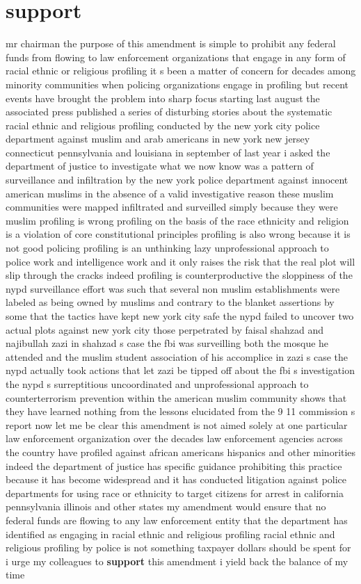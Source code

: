 \documentclass{article}
\begin{document}
\section*{support}
mr chairman the purpose of this amendment is simple to prohibit any federal funds from flowing to law enforcement organizations that engage in any form of racial ethnic or religious profiling it s been a matter of concern for decades among minority communities when policing organizations engage in profiling but recent events have brought the problem into sharp focus starting last august the associated press published a series of disturbing stories about the systematic racial ethnic and religious profiling conducted by the new york city police department against muslim and arab americans in new york new jersey connecticut pennsylvania and louisiana in september of last year i asked the department of justice to investigate what we now know was a pattern of surveillance and infiltration by the new york police department against innocent american muslims in the absence of a valid investigative reason these muslim communities were mapped infiltrated and surveilled simply because they were muslim profiling is wrong profiling on the basis of the race ethnicity and religion is a violation of core constitutional principles profiling is also wrong because it is not good policing profiling is an unthinking lazy unprofessional approach to police work and intelligence work and it only raises the risk that the real plot will slip through the cracks indeed profiling is counterproductive the sloppiness of the nypd surveillance effort was such that several non muslim establishments were labeled as being owned by muslims and contrary to the blanket assertions by some that the tactics have kept new york city safe the nypd failed to uncover two actual plots against new york city those perpetrated by faisal shahzad and najibullah zazi in shahzad s case the fbi was surveilling both the mosque he attended and the muslim student association of his accomplice in zazi s case the nypd actually took actions that let zazi be tipped off about the fbi s investigation the nypd s surreptitious uncoordinated and unprofessional approach to counterterrorism prevention within the american muslim community shows that they have learned nothing from the lessons elucidated from the 9 11 commission s report now let me be clear this amendment is not aimed solely at one particular law enforcement organization over the decades law enforcement agencies across the country have profiled against african americans hispanics and other minorities indeed the department of justice has specific guidance prohibiting this practice because it has become widespread and it has conducted litigation against police departments for using race or ethnicity to target citizens for arrest in california pennsylvania illinois and other states my amendment would ensure that no federal funds are flowing to any law enforcement entity that the department has identified as engaging in racial ethnic and religious profiling racial ethnic and religious profiling by police is not something taxpayer dollars should be spent for i urge my colleagues to {\bf \color{red} support} this amendment i yield back the balance of my time 
\end{document}
